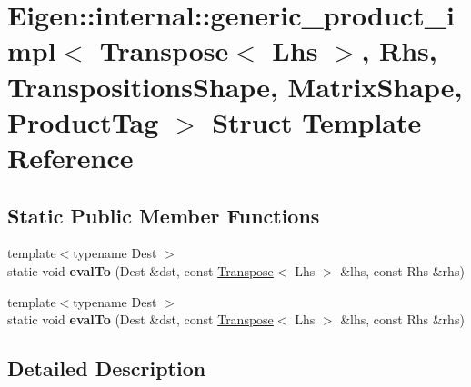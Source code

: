 \hypertarget{struct_eigen_1_1internal_1_1generic__product__impl_3_01_transpose_3_01_lhs_01_4_00_01_rhs_00_01_287c8e613c7656c0ce6593799fd7b329}{}\section{Eigen\+:\+:internal\+:\+:generic\+\_\+product\+\_\+impl$<$ Transpose$<$ Lhs $>$, Rhs, Transpositions\+Shape, Matrix\+Shape, Product\+Tag $>$ Struct Template Reference}
\label{struct_eigen_1_1internal_1_1generic__product__impl_3_01_transpose_3_01_lhs_01_4_00_01_rhs_00_01_287c8e613c7656c0ce6593799fd7b329}
\subsection*{Static Public Member Functions}
\begin{DoxyCompactItemize}
\item 
\mbox{\label{struct_eigen_1_1internal_1_1generic__product__impl_3_01_transpose_3_01_lhs_01_4_00_01_rhs_00_01_287c8e613c7656c0ce6593799fd7b329_a5c70fdb138733ffb2bb8ed8b41e998d8}} 
{\footnotesize template$<$typename Dest $>$ }\\static void {\bfseries eval\+To} (Dest \&dst, const \hyperlink{group___core___module_class_eigen_1_1_transpose}{Transpose}$<$ Lhs $>$ \&lhs, const Rhs \&rhs)
\item 
\mbox{\label{struct_eigen_1_1internal_1_1generic__product__impl_3_01_transpose_3_01_lhs_01_4_00_01_rhs_00_01_287c8e613c7656c0ce6593799fd7b329_a5c70fdb138733ffb2bb8ed8b41e998d8}} 
{\footnotesize template$<$typename Dest $>$ }\\static void {\bfseries eval\+To} (Dest \&dst, const \hyperlink{group___core___module_class_eigen_1_1_transpose}{Transpose}$<$ Lhs $>$ \&lhs, const Rhs \&rhs)
\end{DoxyCompactItemize}


\subsection{Detailed Description}
